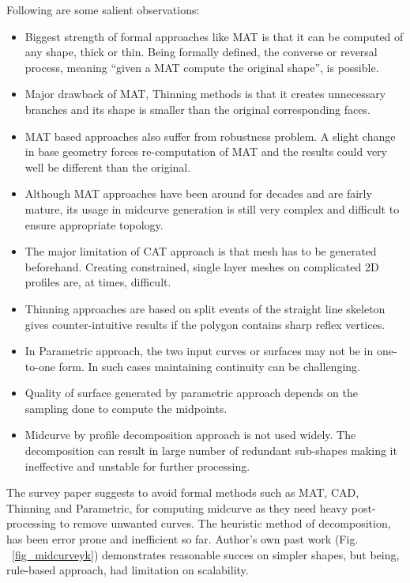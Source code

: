\documentclass[9pt,academicons]{article}
\begin{document}
Following are some salient observations:
\begin{itemize}[noitemsep,topsep=2pt,parsep=2pt,partopsep=2pt]
	\item Biggest strength of formal approaches like MAT is that it can be computed of any shape, thick or thin. Being formally defined, the converse or reversal process, meaning ``given a MAT compute the original shape'', is possible.
	\item Major drawback of MAT, Thinning methods is that it creates unnecessary branches and its shape is smaller than the original corresponding faces.
	\item  MAT based approaches also suffer from robustness problem. A slight change in base geometry forces re-computation of MAT and the results could very well be different than the original.
	\item Although MAT approaches have been around for decades and are fairly mature, its usage in midcurve generation is still very complex and difficult to ensure appropriate topology.
	\item The major limitation of CAT approach is that mesh has to be generated beforehand. Creating constrained, single layer meshes on complicated 2D profiles are, at times, difficult.
	\item Thinning approaches are based on split events of the straight line skeleton gives counter-intuitive results if the polygon contains sharp reflex vertices.
	\item In Parametric approach, the two input curves or surfaces may not be in one-to-one form. In such cases maintaining continuity can be challenging.
	\item Quality of surface generated by parametric approach depends on the sampling done to compute the midpoints.
\item Midcurve by profile decomposition approach is not used widely. The decomposition can result in large number of redundant sub-shapes making it ineffective and unstable for further processing.
\end{itemize}

The survey paper \cite{medial2010} suggests to avoid formal methods such as MAT, CAD, Thinning and Parametric, for computing midcurve as they need heavy post-processing to remove unwanted curves. The heuristic method of decomposition,  has been error prone and inefficient so far. Author's own past work (Fig. ~\ref{fig_midcurveyk}) demonstrates reasonable succes on simpler shapes, but being, rule-based approach, had limitation on scalability.
\end{document}
